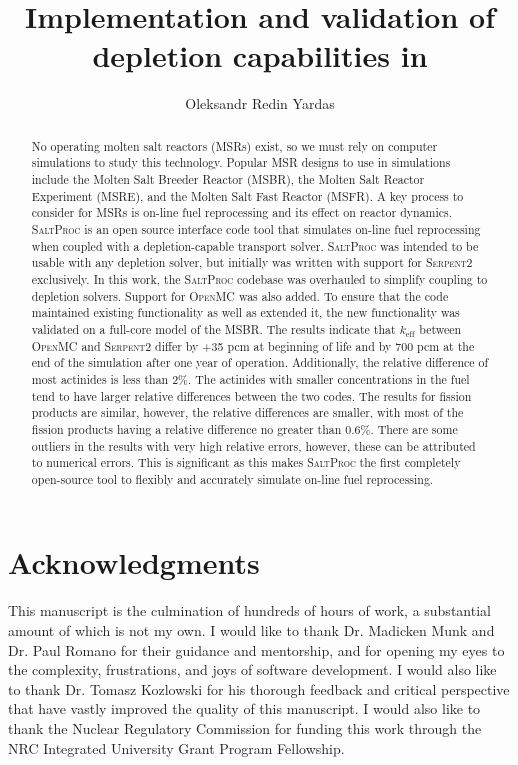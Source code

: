 \documentclass[edeposit,fullpage,hidelinks]{uiucthesis2018}
\title{Implementation and validation of \OpenMC depletion capabilities in \SaltProc}
\author{Oleksandr Redin Yardas}
\newcommand{\SaltProc}{\textsc{SaltProc}\xspace}
\newcommand{\OpenMC}{\textsc{OpenMC}\xspace}
\newcommand{\SerpentTWO}{\textsc{Serpent2}\xspace}
\begin{document}

\maketitle

\frontmatter
\begin{abstract}
No operating molten salt reactors (MSRs) exist, so we must rely on computer simulations
to study this technology. Popular MSR designs to use in simulations
include the Molten Salt Breeder Reactor (MSBR), the Molten Salt Reactor Experiment
(MSRE), and the Molten Salt Fast Reactor (MSFR). A key process to
consider for MSRs is on-line fuel reprocessing and its effect on reactor
dynamics. \SaltProc is an open source interface code tool that simulates on-line
fuel reprocessing when coupled with a depletion-capable transport solver.
\SaltProc was intended to be usable with any depletion solver, but initially was written
with support for \SerpentTWO exclusively. In this work, the \SaltProc codebase was overhauled
to simplify coupling to depletion solvers. Support for \OpenMC was also added.
To ensure that the code maintained existing functionality as well as extended it, the new
functionality was validated on a full-core model of the MSBR. The results indicate that
$k_\text{eff}$ between \OpenMC and \SerpentTWO differ by +35 pcm at beginning of life
and by 700 pcm at the end of the simulation after one year of operation. Additionally,
the relative difference of most actinides is less than 2\%. The actinides
with smaller concentrations in the fuel tend to have larger relative differences
between the two codes. The results for fission products are similar, however, the 
relative differences are smaller, with most of the fission products having a
relative difference no greater than 0.6\%. There are some outliers in the results
with very high relative errors, however, these can be attributed to numerical errors.
This is significant as this makes \SaltProc the first completely open-source tool to
flexibly and accurately simulate on-line fuel reprocessing.
\end{abstract}

\chapter*{Acknowledgments}

This manuscript is the culmination of hundreds of hours of work, a substantial
amount of which is not my own. I would like to thank Dr. Madicken Munk and Dr.
Paul Romano for their guidance and mentorship, and for opening my eyes to the
complexity, frustrations, and joys of software development. I would also like to
thank Dr. Tomasz Kozlowski for his thorough feedback and critical perspective
that have vastly improved the quality of this manuscript. I would also like to
thank the Nuclear Regulatory Commission for funding this work through the NRC
Integrated University Grant Program Fellowship.
\end{document}
